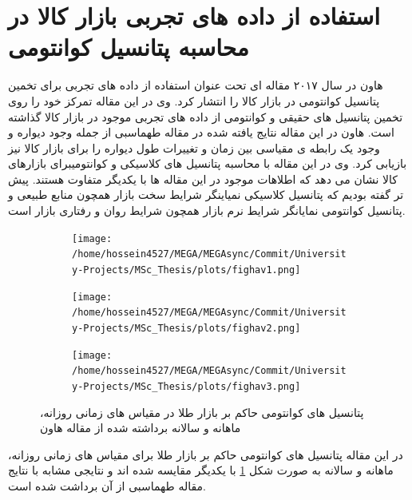 \documentclass[a4paper,titlepage,12pt,fleqn,oneside]{report}
\begin{document}
	\section{استفاده از داده های تجربی بازار کالا در محاسبه پتانسیل کوانتومی }
	هاون در سال ۲۰۱۷ مقاله ای تحت عنوان استفاده از داده های تجربی برای تخمین پتانسیل کوانتومی در بازار کالا
	\cite{shen}
	را انتشار کرد. 
	وی در این مقاله تمرکز خود را روی تخمین پتانسیل های حقیقی و کوانتومی از داده های تجربی موجود در بازار کالا گذاشته است. هاون در این مقاله نتایج یافته شده در مقاله طهماسبی از جمله وجود دیواره و وجود یک رابطه ی مقیاسی بین زمان و تغییرات طول دیواره را برای بازار کالا نیز بازیابی کرد.  وی در این مقاله با محاسبه پتانسیل های کلاسیکی و کوانتومیبرای بازارهای کالا نشان می دهد که اطلاهات موجود در این مقاله ها با یکدیگر متفاوت هستند. پیش تر گفته بودیم که پتانسیل کلاسیکی نمیاینگر شرایط سخت بازار همچون منابع طبیعی و پتانسیل کوانتومی نمایانگر شرایط نرم بازار همچون شرایط روان و رفتاری بازار است. 
	
	\begin{figure}[ptb]
		\begin{subfigure}[b]{0.5\textwidth}
			\renewcommand\thesubfigure{i}
			\centering
			\texttt{[image: /home/hossein4527/MEGA/MEGAsync/Commit/University-Projects/MSc\_Thesis/plots/fighav1.png]}
		\end{subfigure}
		\hfill
		\begin{subfigure}[b]{0.5\textwidth}
			\renewcommand\thesubfigure{i}
			\centering
			\texttt{[image: /home/hossein4527/MEGA/MEGAsync/Commit/University-Projects/MSc\_Thesis/plots/fighav2.png]}
		\end{subfigure}
		\hfill
		\begin{subfigure}[b]{0.5\textwidth}
			\renewcommand\thesubfigure{i}
			\centering
			\texttt{[image: /home/hossein4527/MEGA/MEGAsync/Commit/University-Projects/MSc\_Thesis/plots/fighav3.png]}
		\end{subfigure}
		\hfill
		\caption{پتانسیل های کوانتومی حاکم بر بازار طلا در مقیاس های زمانی روزانه، ماهانه و  سالانه برداشته شده از مقاله هاون
			\cite{shen}}
		\label{fig:10}
	\end{figure}
	در این مقاله پتانسیل های کوانتومی حاکم بر بازار طلا برای مقیاس های زمانی روزانه، ماهانه و سالانه به صورت شکل
	\ref{fig:10}
	با یکدیگر مقایسه شده اند و نتایجی مشابه با نتایج مقاله طهماسبی از آن برداشت شده است. 
	
\end{document}
